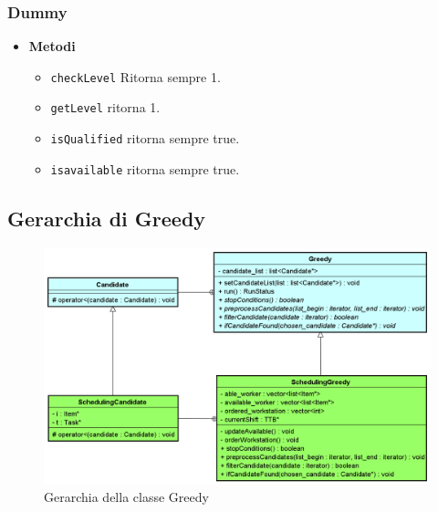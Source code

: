 \subsubsection{Dummy}
\begin{itemize}
    \item \textbf{Metodi}
    \begin{itemize}
        \item \texttt{checkLevel} Ritorna sempre 1.
        \item \texttt{getLevel} ritorna 1.
        \item \texttt{isQualified} ritorna sempre true.
        \item \texttt{is\textunderscore available} ritorna sempre true.
    \end{itemize}
\end{itemize}

\subsection{Gerarchia di Greedy}
\begin{figure}[!h]
    \begin{widepage}
        \centering
        \includegraphics[width=15.5cm,keepaspectratio]{../immagini/progettazione/greedy.png}
        \caption{Gerarchia della classe Greedy}
    \end{widepage}
\end{figure}
\FloatBarrier
\noindent
